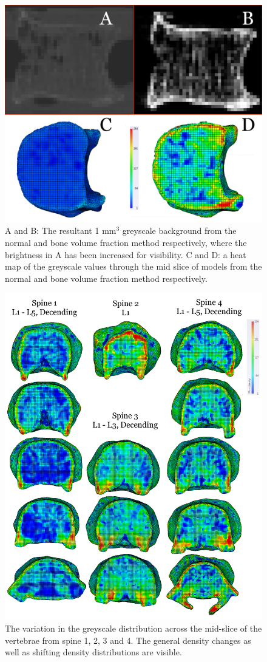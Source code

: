 \begin{figure}[h!]
  \centering
\includegraphics[width=.65\textwidth]{Chapters/Chapter_HT_images/compX4MethodAvsB.png}
\caption{A and B: The resultant 1 mm$^3$ greyscale background from the normal
and bone volume fraction method respectively, where the brightness in A has
been increased for visibility. C and D: a heat map of the greyscale values
through the mid slice of models from the normal and bone volume fraction method
respectively.}
	\label{fig:compX4}
\end{figure}

\begin{figure}[h!]
  \centering
\includegraphics[width=\textwidth]{Chapters/Chapter_HT_images/HT_gs_map.png}
\caption{The variation in the greyscale distribution across the mid-slice of
the vertebrae from spine 1, 2, 3 and 4. The general density changes as well as
shifting density distributions are visible.}
	\label{fig:HT_gs_map}
\end{figure}
